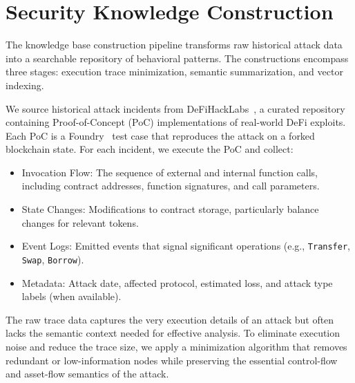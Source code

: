 \section{Security Knowledge Construction}
\label{sec:knowledge-base}

The knowledge base construction pipeline transforms raw historical attack data into a searchable repository of behavioral patterns. The constructions encompass three stages: execution trace minimization, semantic summarization, and vector indexing.


We source historical attack incidents from DeFiHackLabs~\cite{defihacklabs2024}, a curated repository containing Proof-of-Concept (PoC) implementations of real-world DeFi exploits.  Each PoC is a Foundry~\cite{foundry} test case that reproduces the attack on a forked blockchain state. For each incident, we execute the PoC and collect:

\begin{itemize}
    \item Invocation Flow: The sequence of external and internal function calls, including contract addresses, function signatures, and call parameters.
    \item State Changes: Modifications to contract storage, particularly balance changes for relevant tokens.
    \item Event Logs: Emitted events that signal significant operations (e.g., \texttt{Transfer}, \texttt{Swap}, \texttt{Borrow}).
    \item Metadata: Attack date, affected protocol, estimated loss, and attack type labels (when available).
\end{itemize}

The raw trace data captures the very execution details of an attack but often lacks the semantic context needed for effective analysis. 
To eliminate execution noise and reduce the trace size, we apply a minimization algorithm that removes redundant or low-information nodes while preserving the essential control-flow and asset-flow semantics of the attack.

